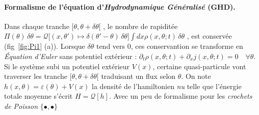 \vspace{-0.5cm}
\paragraph{Formalisme de l'équation d'\emph{Hydrodynamique Généralisé} (GHD).}

Dans chaque tranche $[\theta , \theta + \delta \theta [$ , le nombre de
rapiditée $\Pi(\theta)\, \delta \theta = \mathcal{Q} \big[ (x,\theta') \mapsto
        \delta(\theta' - \theta) \, \delta \theta \big] \int dx \rho ( x , \theta ; t )
    \, \delta \theta$ ,
est conservée (fig~\ref{fig:Pi1} (a)). Lorsque $\delta \theta$ tend vers $0$,
ces conservantion se transforme en \emph{Équation d'Euler} sans potentiel
extérieur : \( \partial_t \rho( x , \theta ; t ) + \partial_x j ( x, \theta ; t
) = 0 \quad \forall \theta . \) Si le système subi un potentiel extérieur
$V(x)$, certaine quasi-particule vont traverser les tranche $[\theta , \theta +
    \delta \theta [$ traduisant un flux selon $\theta$. On note $h(x,\theta) =
    \varepsilon(\theta) + V(x) $ la densité de l'hamiltonien \emph{nu} telle que
l'énergie totale moyenne s'écrit $H = \mathcal{Q}[h]$. Avec un peu de
formalisme pour les {\em crochets de Poisson} $ \{ \bullet , \bullet \}$
